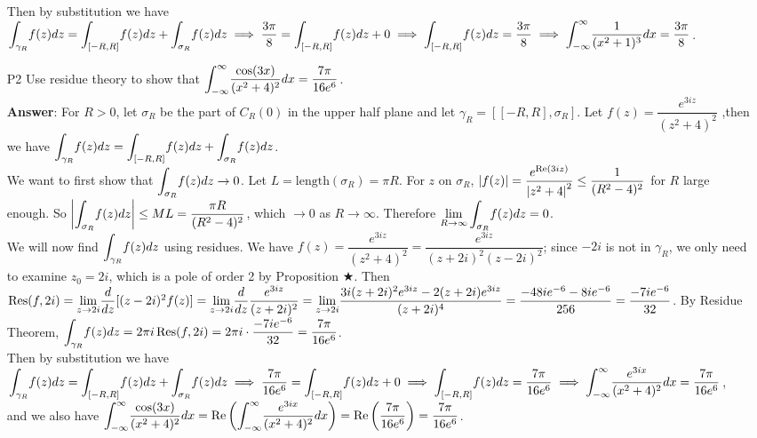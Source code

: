 \documentclass{article}
\begin{document}
\begin{itemize}
            Then by substitution we have $\mathlarger{\int_{\gamma_R}}f(z)dz=\mathlarger{\int_{[-R,R]}}f(z)dz+\mathlarger{\int_{\sigma_R}}f(z)dz\implies\dfrac{3\pi}{8}=\mathlarger{\int_{[-R,R]}}f(z)dz+0\implies\mathlarger{\int_{[-R,R]}}f(z)dz=\dfrac{3\pi}{8}\implies\mathlarger{\int_{-\infty}^\infty}\dfrac{1}{(x^2+1)^3}dx=\dfrac{3\pi}{8}$.
      \item [P2] Use residue theory to show that $\mathlarger{\int_{-\infty}^\infty}\dfrac{\cos(3x)}{(x^2+4)^2}dx=\dfrac{7\pi}{16e^6}$.\\
            \textbf{Answer}: For $R>0$, let $\sigma_R$ be the part of $C_R(0)$ in the upper half plane and let $\gamma_R=[[-R,R],\sigma_R]$. Let $f(z)=\dfrac{e^{3iz}}{(z^2+4)^2}$ ,then we have $\mathlarger{\int_{\gamma_R}}f(z)dz=\mathlarger{\int_{[-R,R]}}f(z)dz+\mathlarger{\int_{\sigma_R}}f(z)dz$.\\
            We want to first show that $\mathlarger{\int_{\sigma_R}}f(z)dz\rightarrow 0$. Let $L=\text{length}(\sigma_R)=\pi R$. For $z$ on $\sigma_R$, $\abs{f(z)}=\dfrac{e^{\Re(3iz)}}{\abs{z^2+4}^2}\leq\dfrac{1}{(R^2-4)^2}$ for $R$ large enough. So $\abs{\mathlarger{\int_{\sigma_R}}f(z)dz}\leq ML=\dfrac{\pi R}{(R^2-4)^2}$, which $\rightarrow 0$ as $R\rightarrow\infty$. Therefore $\mathlarger{\lim_{R\rightarrow\infty}\int_{\sigma_R}}f(z)dz=0$.\\
            We will now find $\mathlarger{\int_{\gamma_R}}f(z)dz$ using residues. We have $f(z)=\dfrac{e^{3iz}}{(z^2+4)^2}=\dfrac{e^{3iz}}{(z+2i)^2(z-2i)^2}$; since $-2i$ is not in $\gamma_R$, we only need to examine $z_0=2i$, which is a pole of order 2 by Proposition $\bigstar$. Then $\Res(f,2i)=\mathlarger{\lim_{z\rightarrow 2i}}\dfrac{d}{dz}[(z-2i)^2f(z)]=\mathlarger{\lim_{z\rightarrow 2i}}\dfrac{d}{dz}\dfrac{e^{3iz}}{(z+2i)^2}=\mathlarger{\lim_{z\rightarrow 2i}}\dfrac{3i(z+2i)^2e^{3iz}-2(z+2i)e^{3iz}}{(z+2i)^4}=\dfrac{-48ie^{-6}-8ie^{-6}}{256}=\dfrac{-7ie^{-6}}{32}$. By Residue Theorem, $\mathlarger{\int_{\gamma_R}}f(z)dz=2\pi i\Res(f,2i)=2\pi i\cdot\dfrac{-7ie^{-6}}{32}=\dfrac{7\pi}{16e^6}$.\\
            Then by substitution we have $\mathlarger{\int_{\gamma_R}}f(z)dz=\mathlarger{\int_{[-R,R]}}f(z)dz+\mathlarger{\int_{\sigma_R}}f(z)dz\implies\dfrac{7\pi}{16e^6}=\mathlarger{\int_{[-R,R]}}f(z)dz+0\implies\mathlarger{\int_{[-R,R]}}f(z)dz=\dfrac{7\pi}{16e^6}\implies\mathlarger{\int_{-\infty}^\infty}\dfrac{e^{3ix}}{(x^2+4)^2}dx=\dfrac{7\pi}{16e^6}$, and we also have $\mathlarger{\int_{-\infty}^\infty}\dfrac{\cos(3x)}{(x^2+4)^2}dx=\Re\left(\mathlarger{\int_{-\infty}^\infty}\dfrac{e^{3ix}}{(x^2+4)^2}dx\right)=\Re\left(\dfrac{7\pi}{16e^6}\right)=\dfrac{7\pi}{16e^6}$.

\end{itemize}
\end{document}
